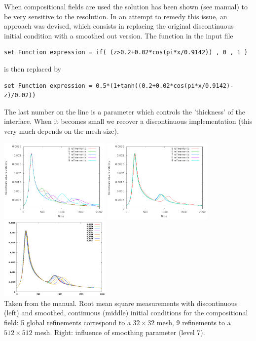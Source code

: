\begin{itemize}
When compositional fields are used the solution has been shown (see \aspect manual)
to be very sensitive to the resolution. In an attempt to remedy this issue, 
an approach was devised, which consists in replacing the original discontinuous initial 
condition with a smoothed out version. The function in the input file 
\begin{lstlisting}
set Function expression = if( (z>0.2+0.02*cos(pi*x/0.9142)) , 0 , 1 )
\end{lstlisting}
is then replaced by 
\begin{lstlisting}
set Function expression = 0.5*(1+tanh((0.2+0.02*cos(pi*x/0.9142)-z)/0.02))
\end{lstlisting}
The last number on the line is a parameter which controls the 'thickness' of the interface.
When it becomes small we recover a discontinuous implementation (this very much 
depends on the mesh size). 


\begin{center}
\includegraphics[width=5.4cm]{images/benchmark_vaks97/aspect/velocity-discontinuous}
\includegraphics[width=5.4cm]{images/benchmark_vaks97/aspect/velocity-smooth}
\includegraphics[width=5.4cm]{images/benchmark_vaks97/aspect/smoothing-parameter-velocity}\\
{\captionfont Taken from the \aspect manual. 
Root mean square measurements with discontinuous (left) and smoothed, continuous 
(middle) initial conditions for the compositional field: 5 global refinements correspond to 
a $32\times 32$ mesh, 9 refinements to a $512 \times 512$ mesh.
Right: influence of smoothing parameter (level 7).}
\end{center}



\end{itemize}
